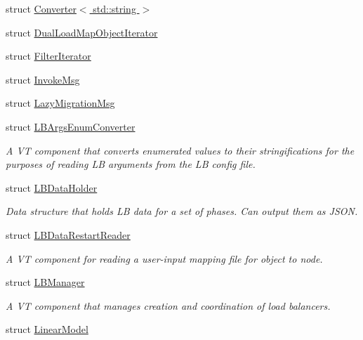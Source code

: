 \begin{DoxyCompactItemize}
\item 
struct \hyperlink{structvt_1_1vrt_1_1collection_1_1balance_1_1_converter_3_01std_1_1string_01_4}{Converter$<$ std\+::string $>$}
\item 
struct \hyperlink{structvt_1_1vrt_1_1collection_1_1balance_1_1_dual_load_map_object_iterator}{Dual\+Load\+Map\+Object\+Iterator}
\item 
struct \hyperlink{structvt_1_1vrt_1_1collection_1_1balance_1_1_filter_iterator}{Filter\+Iterator}
\item 
struct \hyperlink{structvt_1_1vrt_1_1collection_1_1balance_1_1_invoke_msg}{Invoke\+Msg}
\item 
struct \hyperlink{structvt_1_1vrt_1_1collection_1_1balance_1_1_lazy_migration_msg}{Lazy\+Migration\+Msg}
\item 
struct \hyperlink{structvt_1_1vrt_1_1collection_1_1balance_1_1_l_b_args_enum_converter}{L\+B\+Args\+Enum\+Converter}
\begin{DoxyCompactList}\small\item\em A VT component that converts enumerated values to their stringifications for the purposes of reading LB arguments from the LB config file. \end{DoxyCompactList}\item 
struct \hyperlink{structvt_1_1vrt_1_1collection_1_1balance_1_1_l_b_data_holder}{L\+B\+Data\+Holder}
\begin{DoxyCompactList}\small\item\em Data structure that holds LB data for a set of phases. Can output them as J\+S\+ON. \end{DoxyCompactList}\item 
struct \hyperlink{structvt_1_1vrt_1_1collection_1_1balance_1_1_l_b_data_restart_reader}{L\+B\+Data\+Restart\+Reader}
\begin{DoxyCompactList}\small\item\em A VT component for reading a user-\/input mapping file for object to node. \end{DoxyCompactList}\item 
struct \hyperlink{structvt_1_1vrt_1_1collection_1_1balance_1_1_l_b_manager}{L\+B\+Manager}
\begin{DoxyCompactList}\small\item\em A VT component that manages creation and coordination of load balancers. \end{DoxyCompactList}\item 
struct \hyperlink{structvt_1_1vrt_1_1collection_1_1balance_1_1_linear_model}{Linear\+Model}

\end{DoxyCompactItemize}
